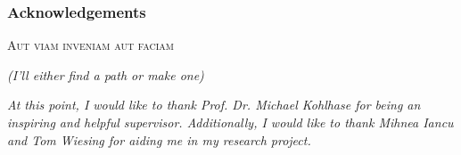 \begin{frame}
  \frametitle{Acknowledgements}
  \begin{module}[id=acknowledgements]

	\vspace*{\fill}
	\begin{center}
	\textsc{Aut viam inveniam aut faciam}\\

	\vspace*{1cm}

	\textit{(I'll either find a path or make one)}\\

	\vspace*{1cm}

	\centering

	\begin{quoting}
		\begin{center}
		\noindent
		\textit{At this point, I would like to thank Prof. Dr. Michael Kohlhase for being an inspiring and helpful supervisor. Additionally, I would like to thank Mihnea Iancu and Tom Wiesing for aiding me in my research project.\\}
		\end{center}
	\end{quoting}

	\vspace*{\fill}
	\end{center}


  \end{module}
\end{frame}
